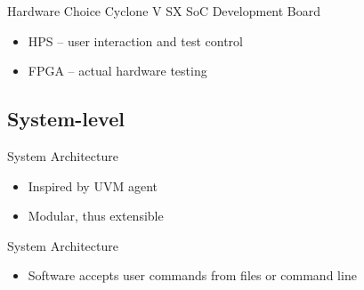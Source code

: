 \documentclass[t]{beamer}
\begin{document}
\begin{frame}{Hardware Choice}
  Cyclone V SX SoC Development Board
  \begin{figure}[H]
    \centering
  \end{figure}
  \begin{itemize}
    \item HPS -- user interaction and test control
    \item FPGA -- actual hardware testing
  \end{itemize}
\end{frame}

\subsection{System-level}
\begin{frame}{System Architecture}
  \begin{itemize}
    \item Inspired by UVM agent
    \item Modular, thus extensible
  \end{itemize}
  \begin{figure}[H]
    \centering
    \resizebox{0.8\textwidth}{!}{%
      
    }
  \end{figure}
\end{frame}

\begin{frame}{System Architecture}
  \begin{figure}[H]
    \centering
    \resizebox{0.8\textwidth}{!}{%
      
    }
  \end{figure}
  \begin{itemize}
    \item Software accepts user commands from files or command line
  \end{itemize}
\end{frame}
\end{document}

